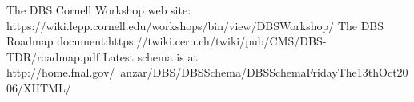 \documentclass{cmspaper}
\begin{document}
\begin{thebibliography}{9}
   {The DBS Cornell Workshop web site: https://wiki.lepp.cornell.edu/workshops/bin/view/DBSWorkshop/}
   {The DBS Roadmap document:https://twiki.cern.ch/twiki/pub/CMS/DBS-TDR/roadmap.pdf}
   {Latest schema is at http://home.fnal.gov/~anzar/DBS/DBSSchema/DBSSchemaFridayThe13thOct2006/XHTML/}

\end{thebibliography}
\end{document}
